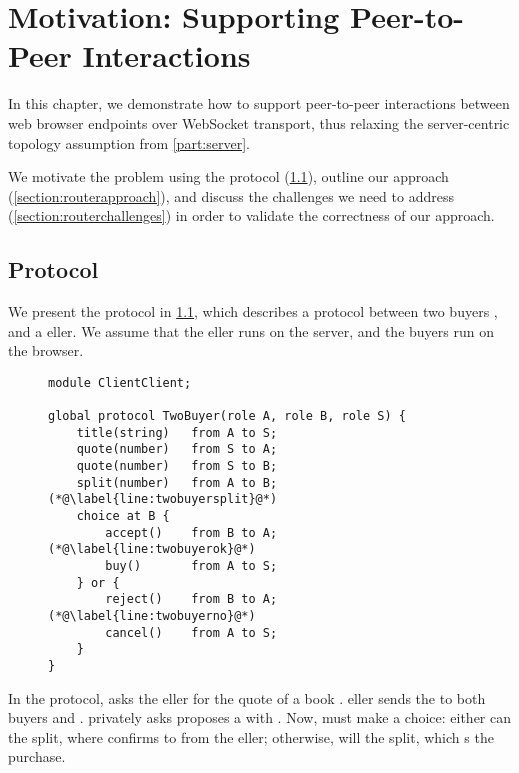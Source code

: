 \chapter{Motivation: Supporting Peer-to-Peer Interactions}
\label{chap:p2p}

In this chapter,
we demonstrate how to support peer-to-peer interactions
between web browser endpoints over WebSocket transport,
thus relaxing the server-centric topology assumption from 
\cref{part:server}.

We motivate the problem using the 
 protocol (\cref{section:twobuyer}),
outline our approach (\cref{section:routerapproach}),
and discuss the challenges we need to address 
(\cref{section:routerchallenges}) in order to validate the
correctness of our approach.

\section{ Protocol}
\label{section:twobuyer}

We present the  protocol in \cref{lst:twobuyer},
which describes a protocol between two buyers , 
and a eller. We assume that the eller runs on
the server, and the buyers run on the browser.

\begin{figure}[!ht]
\begin{lstlisting}[language=scribble]
module ClientClient;

global protocol TwoBuyer(role A, role B, role S) {
	title(string)   from A to S;
	quote(number)   from S to A;
	quote(number)   from S to B;
	split(number)   from A to B; (*@\label{line:twobuyersplit}@*)
	choice at B {
		accept()    from B to A; (*@\label{line:twobuyerok}@*)
		buy()       from A to S;
	} or {
		reject()    from B to A; (*@\label{line:twobuyerno}@*)
		cancel()    from A to S;
	}
}
\end{lstlisting}
\label{lst:twobuyer}
\end{figure}

In the protocol,  asks the eller for the quote
of a book . eller sends the 
to both buyers  and .  privately asks
proposes a  with . Now,  must make
a choice: 
either  can  the split, where  confirms
to  from the eller;
otherwise,  will  the split, which
s the purchase.

